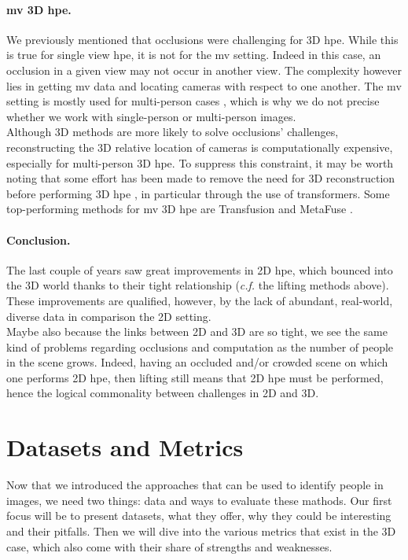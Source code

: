 \documentclass[runningheads]{llncs}
\begin{document}
\paragraph{\ac{mv} 3D \ac{hpe}.}
We previously mentioned that occlusions were challenging for 3D \ac{hpe}. While this is true for single view \ac{hpe}, it is not for the \ac{mv} setting. Indeed in this case, an occlusion in a given view may not occur in another view. The complexity however lies in getting \ac{mv} data and locating cameras with respect to one another. The \ac{mv} setting is mostly used for multi-person cases \cite{survey}, which is why we do not precise whether we work with single-person or multi-person images. \\
Although 3D methods are more likely to solve occlusions' challenges, reconstructing the 3D relative location of cameras is computationally expensive, especially for multi-person 3D \ac{hpe}. To suppress this constraint, it may be worth noting that some effort has been made to remove the need for 3D reconstruction before performing 3D \ac{hpe} \cite{Multi-view Pose transformer}, in particular through the use of transformers. Some top-performing methods for \ac{mv} 3D \ac{hpe} are Transfusion \cite{Transfusion} and MetaFuse \cite{MetaFuse}.

\paragraph{Conclusion.} The last couple of years saw great improvements in 2D \ac{hpe}, which bounced into the 3D world thanks to their tight relationship (\textit{c.f.} the lifting methods above). These improvements are qualified, however, by the lack of abundant, real-world, diverse data in comparison the 2D setting. \\
Maybe also because the links between 2D and 3D are so tight, we see the same kind of problems regarding occlusions and computation as the number of people in the scene grows. Indeed, having an occluded and/or crowded scene on which one performs 2D \ac{hpe}, then lifting still means that 2D \ac{hpe} must be performed, hence the logical commonality between challenges in 2D and 3D.

\section{Datasets and Metrics}
Now that we introduced the approaches that can be used to identify people in images, we need two things: data and ways to evaluate these mathods. Our first focus will be to present datasets, what they offer, why they could be interesting and their pitfalls. Then we will dive into the various metrics that exist in the 3D case, which also come with their share of strengths and weaknesses.
\end{document}
